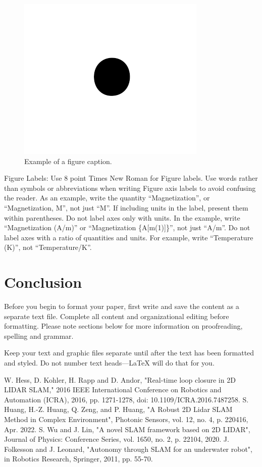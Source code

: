 \documentclass[conference]{IEEEtran}
\begin{document}
\begin{figure}[htbp]
\centerline{\includegraphics{fig1.png}}
\caption{Example of a figure caption.}
\label{fig}
\end{figure}

Figure Labels: Use 8 point Times New Roman for Figure labels. Use words 
rather than symbols or abbreviations when writing Figure axis labels to 
avoid confusing the reader. As an example, write the quantity 
``Magnetization'', or ``Magnetization, M'', not just ``M''. If including 
units in the label, present them within parentheses. Do not label axes only 
with units. In the example, write ``Magnetization (A/m)'' or ``Magnetization 
\{A[m(1)]\}'', not just ``A/m''. Do not label axes with a ratio of 
quantities and units. For example, write ``Temperature (K)'', not 
``Temperature/K''.

\section{Conclusion}
Before you begin to format your paper, first write and save the content as a 
separate text file. Complete all content and organizational editing before 
formatting. Please note sections below for more information on 
proofreading, spelling and grammar.

Keep your text and graphic files separate until after the text has been 
formatted and styled. Do not number text heads---{\LaTeX} will do that 
for you.

\begin{thebibliography}{00}
 W. Hess, D. Kohler, H. Rapp and D. Andor, "Real-time loop closure in 2D LIDAR SLAM," 2016 IEEE International Conference on Robotics and Automation (ICRA), 2016, pp. 1271-1278, doi: 10.1109/ICRA.2016.7487258.
 S. Huang, H.-Z. Huang, Q. Zeng, and P. Huang, "A Robust 2D Lidar SLAM Method in Complex Environment", Photonic Sensors, vol. 12, no. 4, p. 220416, Apr. 2022.
 S. Wu and J. Lin, "A novel SLAM framework based on 2D LIDAR", Journal of Physics: Conference Series, vol. 1650, no. 2, p. 22104, 2020.
 J. Folkesson and J. Leonard, "Autonomy through SLAM for an underwater robot", in Robotics Research, Springer, 2011, pp. 55-70.
\end{thebibliography}
\vspace{12pt}
\end{document}
